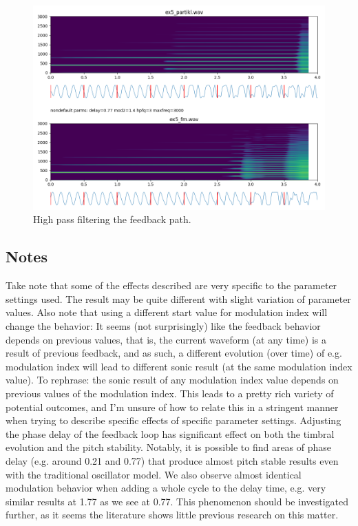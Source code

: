 \documentclass[runningheads,a4paper]{llncs}
\begin{document}
\begin{figure}
	\centering
	\includegraphics[width=.95\textwidth]{ex5_compare.png}
	\caption{High pass filtering the feedback path.}
	\label{fig:ex5}
\end{figure}

\subsection{Notes}
Take note that some of the effects described are very specific to the parameter settings used. The result may be quite different with slight variation of parameter values. Also note that using a different start value for modulation index will change the behavior: It seems (not surprisingly) like the feedback behavior depends on previous values, that is, the current waveform (at any time) is a result of previous feedback, and as such, a different evolution (over time) of e.g. modulation index will lead to different sonic result (at the same modulation index value). To rephrase: the sonic result of any modulation index value depends on previous values of the modulation index. This leads to a pretty rich variety of potential outcomes, and I'm unsure of how to relate this in a stringent manner when trying to describe specific effects of specific parameter settings.
Adjusting the phase delay of the feedback loop has significant effect on both the timbral evolution and the pitch stability. Notably, it is possible to find areas of phase delay (e.g. around 0.21 and 0.77) that produce almost pitch stable results even with the traditional oscillator model. We also observe almost identical modulation behavior when adding a whole cycle to the delay time, e.g. very similar results at 1.77 as we see at 0.77. This phenomenon should be investigated further, as it seems the literature shows little previous research on this matter.
\end{document}
